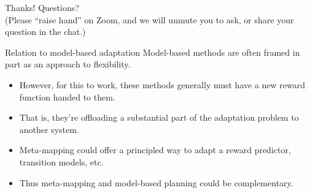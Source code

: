 \documentclass{beamer}
\begin{document}
\begin{frame}[standout]
Thanks! Questions?\\[1em]
{\normalsize (Please ``raise hand'' on Zoom, and we will unmute you to ask, or share your question in the chat.)}
\end{frame}

\begin{frame}{Relation to model-based adaptation}
Model-based methods are often framed in part as an approach to flexibility.
\begin{itemize}
\item However, for this to work, these methods generally must have a new reward function handed to them.
\item That is, they're offloading a substantial part of the adaptation problem to another system.
\item Meta-mapping could offer a principled way to adapt a reward predictor, transition models, etc.
\item Thus meta-mapping and model-based planning could be complementary.
\end{itemize}
\end{frame}
\end{document}
